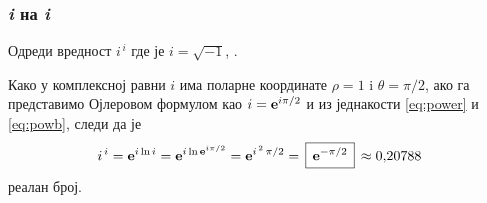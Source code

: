 \subsubsection{\textit{i} на \textit{i}}

\zadatak Одреди вредност $i^{\,i}$ где је $i=\sqrt{-1}$, {\sl{}}.

\resenje
Како у комплексној равни $i$ има поларне координате $\rho=1$ i $\theta=\pi/2$, 
ако га представимо Ојлеровом формулом као
$i={\bf e}^{i\pi/2}$ и из једнакости \eqref{eq:power} и \eqref{eq:powb}, следи да је
$$
i^{\,i}=\e^{i\ln i} = \e^{i\ln \e^{i\pi/2}}=\e^{i^{\,2}\,\pi/2}=\ram{\e^{-\pi/2}}\approx0\.20788 
$$
реалан број.
